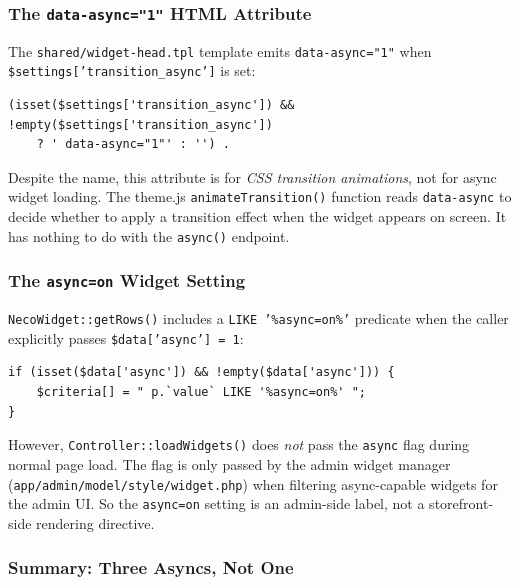 \documentclass[11pt,a4paper]{article}
\begin{document}
\subsubsection{The \texttt{data-async="1"} HTML Attribute}

The \texttt{shared/widget-head.tpl} template emits
\texttt{data-async="1"} when
\texttt{\$settings['transition\_async']} is set:

\begin{lstlisting}[caption={The \texttt{data-async} attribute in \texttt{widget-head.tpl}.},label={lst:data-async}]
(isset($settings['transition_async']) && !empty($settings['transition_async'])
    ? ' data-async="1"' : '') .
\end{lstlisting}

Despite the name, this attribute is for \emph{CSS transition
animations}, not for async widget loading. The theme.js
\texttt{animateTransition()} function reads
\texttt{data-async} to decide whether to apply a transition
effect when the widget appears on screen. It has nothing to do
with the \texttt{async()} endpoint.

\subsubsection{The \texttt{async=on} Widget Setting}

\texttt{NecoWidget::getRows()} includes a
\texttt{LIKE '\%async=on\%'} predicate when the caller explicitly
passes \texttt{\$data['async'] = 1}:

\begin{lstlisting}[caption={The \texttt{async=on} filter in \texttt{NecoWidget::getRows()}.},label={lst:async-setting}]
if (isset($data['async']) && !empty($data['async'])) {
    $criteria[] = " p.`value` LIKE '%async=on%' ";
}
\end{lstlisting}

However, \texttt{Controller::loadWidgets()} does \emph{not} pass
the \texttt{async} flag during normal page load. The flag is only
passed by the admin widget manager
(\texttt{app/admin/model/style/widget.php}) when filtering
async-capable widgets for the admin UI. So the
\texttt{async=on} setting is an admin-side label, not a
storefront-side rendering directive.

\subsubsection{Summary: Three Asyncs, Not One}
\end{document}

